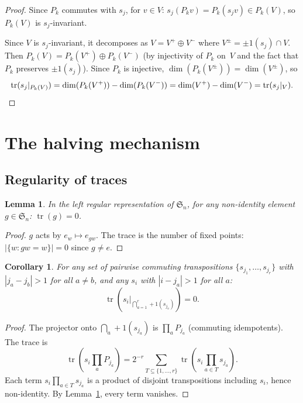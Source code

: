 \documentclass[11pt]{article}
\newtheorem{lemma}[theorem]{Lemma}
\newtheorem{corollary}[theorem]{Corollary}
\theoremstyle{definition}
\theoremstyle{remark}
\newcommand{\Sym}{\mathfrak{S}}
\newcommand{\tr}{\operatorname{tr}}
\begin{document}
\begin{proof}
Since $P_k$ commutes with $s_j$, for $v \in V$:
$s_j(P_k v) = P_k(s_j v) \in P_k(V)$, so $P_k(V)$ is $s_j$-invariant.

Since $V$ is $s_j$-invariant, it decomposes as $V = V^+ \oplus V^-$
where $V^\pm = \pm 1(s_j) \cap V$. Then
$P_k(V) = P_k(V^+) \oplus P_k(V^-)$ (by injectivity of $P_k$ on~$V$
and the fact that $P_k$ preserves $\pm 1(s_j)$). Since $P_k$ is
injective, $\dim(P_k(V^\pm)) = \dim(V^\pm)$, so
\[
  \tr(s_j|_{P_k(V)}) = \dim(P_k(V^+)) - \dim(P_k(V^-))
  = \dim(V^+) - \dim(V^-) = \tr(s_j|_V). \qedhere
\]
\end{proof}


\section{The halving mechanism}

\subsection{Regularity of traces}

\begin{lemma}
\label{lem:reg-trace}
In the left regular representation of $\Sym_n$, for any non-identity
element $g \in \Sym_n$: $\tr(g) = 0$.
\end{lemma}

\begin{proof}
$g$ acts by $e_w \mapsto e_{gw}$. The trace is the number of fixed
points: $|\{w : gw = w\}| = 0$ since $g \ne e$.
\end{proof}

\begin{corollary}
\label{cor:trace-eigenspace}
For any set of pairwise commuting transpositions $\{s_{j_1}, \dots, s_{j_r}\}$
with $|j_a - j_b| > 1$ for all $a \ne b$, and any $s_i$ with
$|i - j_a| > 1$ for all $a$:
\[
  \tr\!\left(s_i \big|_{\bigcap_{a=1}^r +1(s_{j_a})}\right) = 0.
\]
\end{corollary}

\begin{proof}
The projector onto $\bigcap_a +1(s_{j_a})$ is $\prod_a P_{j_a}$
(commuting idempotents). The trace is
\[
  \tr\!\left(s_i \prod_a P_{j_a}\right)
  = 2^{-r} \sum_{T \subseteq \{1,\dots,r\}}
    \tr\!\left(s_i \prod_{a \in T} s_{j_a}\right).
\]
Each term $s_i \prod_{a \in T} s_{j_a}$ is a product of disjoint
transpositions including $s_i$, hence non-identity. By
Lemma~\ref{lem:reg-trace}, every term vanishes.
\end{proof}
\end{document}
